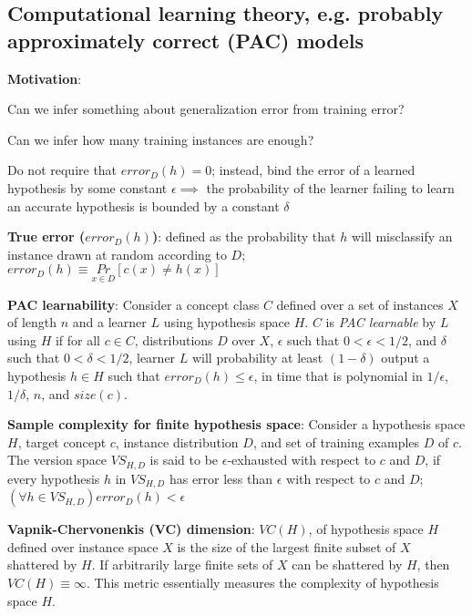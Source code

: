 \documentclass[letterpaper,fontsize=5pt]{scrartcl}
\renewenvironment{enumerate}[1]{\begin{compactenum}#1}{\end{compactenum}}
\theoremstyle{definition}
\begin{document}
\begin{multicols}{2}
\section{Computational learning theory, e.g. probably approximately correct (PAC) models}
	\begin{enumerate}
		\item \textbf{Motivation}:
			\begin{enumerate}
				\item Can we infer something about generalization error from training error?
				\item Can we infer how many training instances are enough?
				\item Do not require that $error_D(h) = 0$; instead, bind the error of a learned hypothesis by some constant $\epsilon \implies$ the probability of the learner failing to learn an accurate hypothesis is bounded by a constant $\delta$
			\end{enumerate}
		\item \textbf{True error ($error_D(h)$)}: defined as the probability that $h$ will misclassify an instance drawn at random according to $D$; \\ $error_D(h) \equiv \underset{x \in D}{Pr}[c(x) \neq h(x)]$
		\item \textbf{PAC learnability}: Consider a concept class $C$ defined over a set of instances $X$ of length $n$ and a learner $L$ using hypothesis space $H$. $C$ is \emph{PAC learnable} by $L$ using $H$ if for all $c \in C$, distributions $D$ over $X$, $\epsilon$ such that $0 < \epsilon < 1/2$, and $\delta$ such that $0 < \delta < 1/2$, learner $L$ will probability at least $(1-\delta)$ output a hypothesis $h \in H$ such that $error_D(h) \leq \epsilon$, in time that is polynomial in $1/\epsilon$, $1/\delta$, $n$, and $size(c)$.
		\item \textbf{Sample complexity for finite hypothesis space}: Consider a hypothesis space $H$, target concept $c$, instance distribution $D$, and set of training examples $D$ of $c$. The version space $VS_{H,D}$ is said to be $\epsilon$-exhausted with respect to $c$ and $D$, if every hypothesis $h$ in $VS_{H,D}$ has error less than $\epsilon$ with respect to $c$ and $D$; $(\forall h \in VS_{H,D}) error_D(h) < \epsilon $
		\item \textbf{Vapnik-Chervonenkis (VC) dimension}: $VC(H)$, of hypothesis space $H$ defined over instance space $X$ is the size of the largest finite subset of $X$ shattered by $H$. If arbitrarily large finite sets of $X$ can be shattered by $H$, then $VC(H) \equiv \infty$. This metric essentially measures the complexity of hypothesis space $H$.

\end{enumerate}
\end{multicols}
\end{document}
